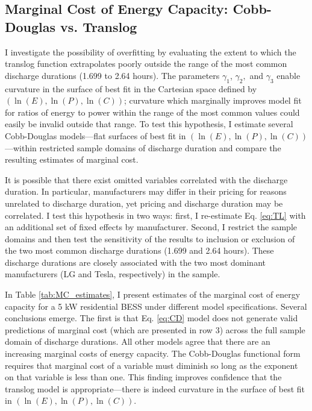 \subsection{Marginal Cost of Energy Capacity: Cobb-Douglas vs. Translog}\label{apdx:mc}

I investigate the possibility of overfitting by evaluating the extent to which the translog function extrapolates poorly outside the range of the most common discharge durations (1.699 to 2.64 hours). The parameters $\gamma_1$, $\gamma_2,$ and $\gamma_3$ enable curvature in the surface of best fit in the Cartesian space defined by $(\ln(E), \ln(P), \ln(C))$; curvature which marginally improves model fit for ratios of energy to power within the range of the most common values could easily be invalid outside that range. To test this hypothesis, I estimate several Cobb-Douglas models---flat surfaces of best fit in $(\ln(E), \ln(P), \ln(C))$---within restricted sample domains of discharge duration and compare the resulting estimates of marginal cost. 

It is possible that there exist omitted variables correlated with the discharge duration. In particular, manufacturers may differ in their pricing for reasons unrelated to discharge duration, yet pricing and discharge duration may be correlated. I test this hypothesis in two ways: first, I re-estimate Eq. \ref{eq:TL} with an additional set of fixed effects by manufacturer. Second, I restrict the sample domains and then test the sensitivity of the results to inclusion or exclusion of the two most common discharge durations (1.699 and 2.64 hours). These discharge durations are closely associated with the two most dominant manufacturers (LG and Tesla, respectively) in the sample.

In Table \ref{tab:MC_estimates}, I present estimates of the marginal cost of energy capacity for a 5 kW residential BESS under different model specifications. Several conclusions emerge. The first is that Eq. \ref{eq:CD} model does not generate valid predictions of marginal cost (which are presented in row 3) across the full sample domain of discharge durations. All other models agree that there are an increasing marginal costs of energy capacity. The Cobb-Douglas functional form requires that marginal cost of a variable must diminish so long as the exponent on that variable is less than one. This finding improves confidence that the translog model is appropriate---there is indeed curvature in the surface of best fit in $(\ln(E), \ln(P), \ln(C))$.

